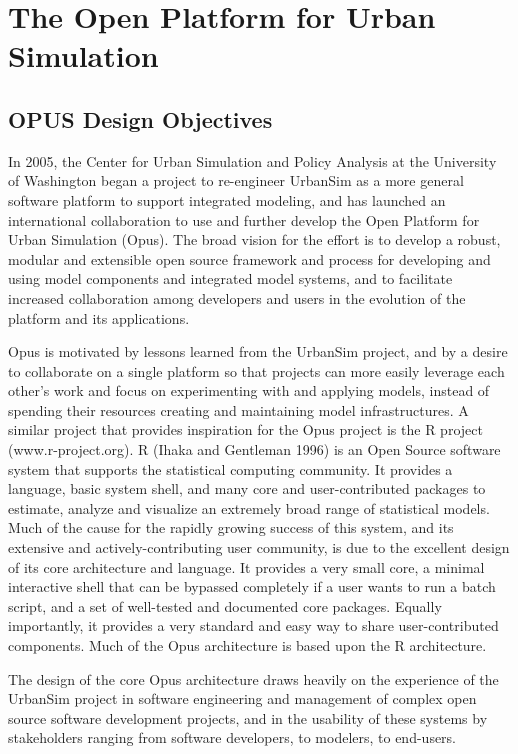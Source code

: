 \chapter{The Open Platform for Urban Simulation}

\section{OPUS Design Objectives}
In 2005, the Center for Urban Simulation and Policy Analysis at the University of Washington 
began a project to re-engineer UrbanSim as a more general software platform to support
integrated modeling, and has launched an international collaboration to use and further 
develop the Open Platform for Urban Simulation (Opus).  The broad vision for the effort is 
to develop a robust, modular and extensible open source framework and process for 
developing and using model components and integrated model systems, and to facilitate 
increased collaboration among developers and users in the evolution of the platform and 
its applications.  

Opus is motivated by lessons learned from the UrbanSim project, and by a desire to collaborate 
on a single platform so that projects can more easily leverage each other's work and focus on 
experimenting with and applying models, instead of spending their resources creating and 
maintaining model infrastructures.  
A similar project that provides inspiration for the Opus project is the R project (www.r-project.org).  
R (Ihaka and Gentleman 1996) is an Open Source software system that supports the statistical 
computing community.  It provides a language, basic system shell, and many core and 
user-contributed packages to estimate, analyze and visualize an extremely broad range of statistical 
models.  Much of the cause for the rapidly growing success of this system, and its extensive and 
actively-contributing user community, is due to the excellent design of its core architecture and 
language.  It provides a very small core, a minimal interactive shell that can be bypassed completely 
if a user wants to run a batch script, and a set of well-tested and documented core packages.  Equally 
importantly, it provides a very standard and easy way to share user-contributed components.  Much 
of the Opus architecture is based upon the R architecture.

The design of the core Opus architecture draws heavily on the experience of the UrbanSim project in 
software engineering and management of complex open source software development projects, and 
in the usability of these systems by stakeholders ranging from software developers, to modelers, to 
end-users.   

